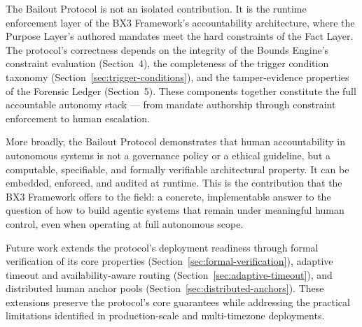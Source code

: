 The Bailout Protocol is not an isolated contribution. It is the runtime enforcement layer of the BX3 Framework's accountability architecture, where the Purpose Layer's authored mandates meet the hard constraints of the Fact Layer. The protocol's correctness depends on the integrity of the Bounds Engine's constraint evaluation (Section~4), the completeness of the trigger condition taxonomy (Section~\ref{sec:trigger-conditions}), and the tamper-evidence properties of the Forensic Ledger (Section~5). These components together constitute the full accountable autonomy stack — from mandate authorship through constraint enforcement to human escalation.

More broadly, the Bailout Protocol demonstrates that human accountability in autonomous systems is not a governance policy or a ethical guideline, but a computable, specifiable, and formally verifiable architectural property. It can be embedded, enforced, and audited at runtime. This is the contribution that the BX3 Framework offers to the field: a concrete, implementable answer to the question of how to build agentic systems that remain under meaningful human control, even when operating at full autonomous scope.

Future work extends the protocol's deployment readiness through formal verification of its core properties (Section~\ref{sec:formal-verification}), adaptive timeout and availability-aware routing (Section~\ref{sec:adaptive-timeout}), and distributed human anchor pools (Section~\ref{sec:distributed-anchors}). These extensions preserve the protocol's core guarantees while addressing the practical limitations identified in production-scale and multi-timezone deployments.

